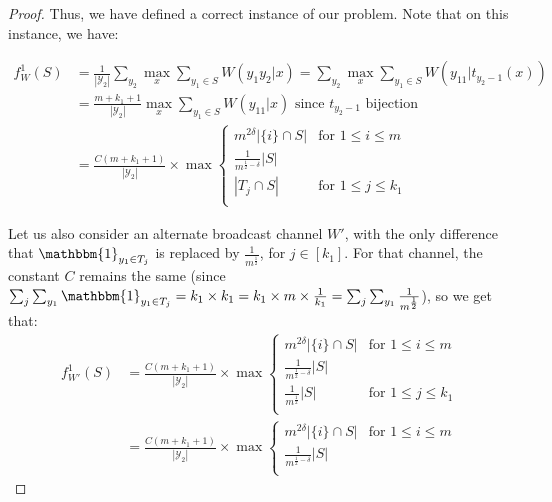 \begin{proof}
  Thus, we have defined a correct instance of our problem. Note that on this instance, we have:

  \begin{equation}
    \begin{aligned}
      f_W^1(S) &= \frac{1}{|\mathcal{Y}_2|}\sum_{y_2} \max_x \sum_{y_1 \in S} W(y_1y_2|x) = \sum_{y_2} \max_x \sum_{y_1 \in S} W(y_11|t_{y_2-1}(x))\\
      &= \frac{m+k_1+1}{|\mathcal{Y}_2|}\max_x \sum_{y_1 \in S} W(y_11|x) \text{ since $t_{y_2-1}$ bijection}\\
      &= \frac{C(m+k_1+1)}{|\mathcal{Y}_2|} \times \max\begin{cases}
      m^{2\delta}|\{i\} \cap S| & \text{for } 1 \leq i \leq m\\
      \frac{1}{m^{\frac{1}{2}-\delta}}|S|\\
      |T_j \cap S| & \text{for } 1 \leq j \leq k_1\\
      \end{cases}
    \end{aligned}
  \end{equation}
      
  Let us also consider an alternate broadcast channel $W'$, with the only difference that $\mathbbm{1}_{y_1 \in T_j}$ is replaced by $\frac{1}{m^{\frac{1}{2}}}$, for $j \in [k_1]$. For that channel, the constant $C$ remains the same (since $\sum_j\sum_{y_1}\mathbbm{1}_{y_1 \in T_j} = k_1 \times k_1 = k_1 \times m \times \frac{1}{k_1} = \sum_j\sum_{y_1}\frac{1}{m^{\frac{1}{2}}}$), so we get that:
  \begin{equation}
    \begin{aligned}
      f_{W'}^1(S) &= \frac{C(m+k_1+1)}{|\mathcal{Y}_2|} \times \max\begin{cases}
      m^{2\delta}|\{i\} \cap S| & \text{for } 1 \leq i \leq m\\
      \frac{1}{m^{\frac{1}{2}-\delta}}|S|\\
      \frac{1}{m^{\frac{1}{2}}}|S| & \text{for } 1 \leq j \leq k_1\\
      \end{cases}\\
      &= \frac{C(m+k_1+1)}{|\mathcal{Y}_2|} \times \max\begin{cases}
      m^{2\delta}|\{i\} \cap S| & \text{for } 1 \leq i \leq m\\
      \frac{1}{m^{\frac{1}{2}-\delta}}|S|\\
      \end{cases}
    \end{aligned}
  \end{equation}


\end{proof}

